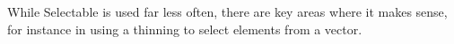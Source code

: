 {\begin{code}
\AgdaSymbol{)}\<%
\\
\>[0]\AgdaSpace{}%
\AgdaSymbol{\{}\AgdaSymbol{\}}\AgdaSpace{}%
\AgdaSymbol{(}\AgdaSpace{}%
\AgdaSpace{}%
\AgdaSymbol{)}%
\>[29]\AgdaSpace{}%
\AgdaSymbol{=}\AgdaSpace{}%
\AgdaSymbol{(}\AgdaSpace{}%
\AgdaSpace{}%
\AgdaSymbol{)}\AgdaSpace{}%
\AgdaSpace{}%
\AgdaSymbol{(}\AgdaSpace{}%
\AgdaSpace{}%
\AgdaSymbol{)}\<%
\\
%
\\[\AgdaEmptyExtraSkip]%
\>[0]\AgdaSpace{}%
\AgdaSpace{}%
\AgdaSpace{}%
%
\>[19]\AgdaSymbol{=}\AgdaSpace{}%
\<%
\\
\>[0]\AgdaSpace{}%
\AgdaSpace{}%
\AgdaSymbol{(}\AgdaSpace{}%
\AgdaOperator{\AgdaInductiveConstructor{-,}}\AgdaSpace{}%
\AgdaSymbol{)}\AgdaSpace{}%
\AgdaSpace{}%
\AgdaSymbol{=}\AgdaSpace{}%
\AgdaSpace{}%
\AgdaSpace{}%
\AgdaSpace{}%
\AgdaSpace{}%
\AgdaOperator{\AgdaInductiveConstructor{-,}}\AgdaSpace{}%
\AgdaSpace{}%
\AgdaSpace{}%
\<%
\end{code}
}

While Selectable is used far less often, there are key areas where it makes
sense, for instance in using a thinning to select elements from a vector.

\begin{code}%
\>[0]\AgdaOperator{\AgdaFunction{\AgdaUnderscore{}!\AgdaUnderscore{}}}\AgdaSpace{}%
\AgdaSymbol{:}\AgdaSpace{}%
\AgdaSpace{}%
\AgdaSymbol{(}\AgdaSpace{}%
\AgdaSymbol{)}\<%
\end{code}

